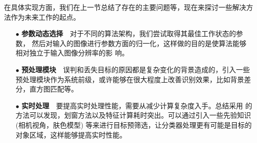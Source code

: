 在具体实现方面，我们在上一节总结了存在的主要问题等，现在来探讨一些解决方法作为未来工作的起点。
\begin{enumerate}
    \item[$\bullet$] \textbf{参数动态选择}~~对于不同的算法架构，我们尝试取得其最佳工作状态的参数，
        然后对输入的图像进行参数方面的归一化，这样做的目的是使算法能够相对独立于输入图像分辨率的影
        响。
    \item[$\bullet$] \textbf{预处理模块}~~误判和丢失目标的原因都是复杂变化的背景造成的，引入一些
        预处理模块作为系统前级，或许能够在很大程度上改善识别效果，比如背景差分，直方图匹配等。
    \item[$\bullet$] \textbf{实时处理}~~要提高实时处理性能，需要从减少计算复杂度入手。总结采用
        的方法可以发现，划窗方法以及特征计算耗时突出。可以通过引入一些先验知识(相机视角，肤色模型)
        等来进行目标预筛选，让分类器处理更有可能是目标的对象区域，这样能够提高实时性能。
\end{enumerate}
    
